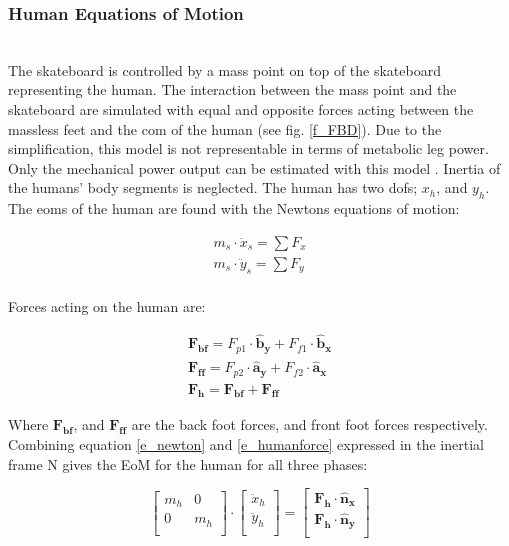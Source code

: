 \documentclass[default,iicol]{sn-jnl}
\begin{document}
\subsubsection{Human Equations of Motion} \\
\noindent The skateboard is controlled by a mass point on top of the skateboard representing the human. The interaction between the mass point and the skateboard are simulated with equal and opposite forces acting between the massless feet and the \gls{com} of the human (see fig. \ref{f_FBD}). Due to the simplification, this model is not representable in terms of metabolic leg power. Only the mechanical power output can be estimated with this model \cite{van_der_kruk_power_2018,morin_biomechanics_2018}. Inertia of the humans' body segments is neglected. 
The human has two \glspl{dof}; $x_h$, and $y_h$. The \glspl{eom} of the human are found with the Newtons equations of motion:

\begin{equation}\label{e_newton}
\begin{array}{c}
        m_s \cdot \ddot x_s = \sum F_x  \\
        m_s \cdot \ddot y_s = \sum F_y  \\
    \end{array}
\end{equation}

\noindent Forces acting on the human are:

\begin{equation} \label{e_humanforce}
\begin{array}{cc}
      \mathbf{F_{bf}} = F_{p1} \cdot \mathbf{\hat b_y} + F_{f1} \cdot \mathbf{\hat b_x}\\
      \mathbf{F_{ff}} = F_{p2} \cdot \mathbf{\hat a_y} + F_{f2} \cdot \mathbf{\hat a_x}\\
      \mathbf{F_h}    = \mathbf{F_{bf}} + \mathbf{F_{ff}}
\end{array}
\end{equation}

\noindent Where $\mathbf{F_{bf}}$, and  $\mathbf{F_{ff}}$ are the back foot forces, and front foot forces respectively. Combining equation \ref{e_newton} and \ref{e_humanforce} expressed in the inertial frame N gives the EoM for the human for all three phases:

\begin{equation} \label{e_humaneom}
    \left[\begin{array}{cc}
        m_h & 0 \\
        0 & m_h \\
    \end{array}\right] \cdot \left[\begin{array}{c}
         \ddot x_h  \\
         \ddot y_h \\
    \end{array}\right]=\left[\begin{array}{c}
        \mathbf{F_h}\cdot \mathbf{\hat n_x}  \\
        \mathbf{F_h}\cdot \mathbf{\hat n_y}\\
    \end{array}\right]
\end{equation}
\end{document}
